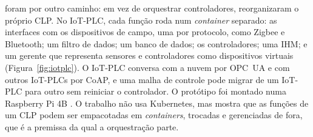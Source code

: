  foram por outro caminho: em vez de orquestrar controladores, reorganizaram o próprio CLP. No IoT-PLC, cada função roda num \textit{container} separado: as interfaces com os dispositivos de campo, uma por protocolo, como Zigbee e Bluetooth; um filtro de dados; um banco de dados; os controladores; uma IHM; e um gerente que representa sensores e controladores como dispositivos virtuais (Figura~\ref{fig:iotplc}). O IoT-PLC conversa com a nuvem por OPC~UA e com outros IoT-PLCs por CoAP, e uma malha de controle pode migrar de um IoT-PLC para outro sem reiniciar o controlador. O protótipo foi montado numa Raspberry Pi 4B \cite{Mellado2022}. O trabalho não usa Kubernetes, mas mostra que as funções de um CLP podem ser empacotadas em \textit{containers}, trocadas e gerenciadas de fora, que é a premissa da qual a orquestração parte.

